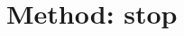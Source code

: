 \documentclass[../../../../dd.tex]{subfiles}
\begin{document}
	\section{Method: stop}
\end{document}
